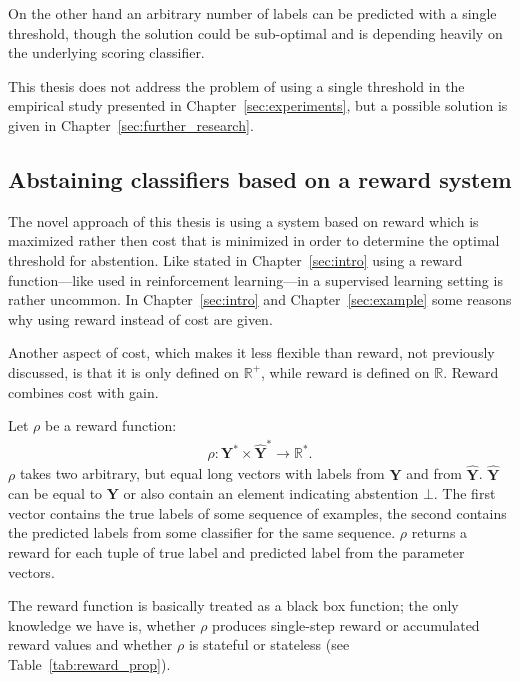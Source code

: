 \documentclass[twoside,11pt]{article}
\def\Y{\textbf{Y}}
\begin{document}
On the other hand an arbitrary number of labels can be
predicted with a single threshold, though the solution
could be sub-optimal and is depending heavily on the
underlying scoring classifier.

This thesis does not address the problem of using a single
threshold in the empirical
study presented in Chapter~\ref{sec:experiments}, but a
possible solution is given in
Chapter~\ref{sec:further_research}.

\subsection{Abstaining classifiers based on a reward
    system}
\label{subsec:reward}

The novel approach of this thesis is using a system based
on reward which is maximized rather then cost that is
minimized in order to determine the optimal threshold for
abstention.
Like stated in Chapter~\ref{sec:intro} using a reward
function---like used in reinforcement learning---in a
supervised learning setting is rather uncommon.
In Chapter~\ref{sec:intro} and Chapter~\ref{sec:example}
some reasons why using reward instead of cost are given.

Another aspect of cost, which makes it less flexible than
reward, not previously discussed, is that it is only
defined on $\mathbb{R}^+$, while reward is defined on
$\mathbb{R}$.
Reward combines cost with gain.

Let $\rho$ be a reward function:
\begin{align}
  \label{eq:rho}
  \rho: \Y^* \times \hat{\Y}^* \rightarrow \mathbb{R}^*.
\end{align}
$\rho$ takes two arbitrary, but equal long vectors with
labels from $\Y$ and from $\hat{\Y}$. $\hat{\Y}$ can be
equal to $\Y$ or also contain an element indicating
abstention $\bot$.
The first vector contains the true labels of some sequence
of examples, the second contains the predicted labels from
some classifier for the same sequence.
$\rho$ returns a reward for each tuple of true
label and predicted label from the parameter vectors.

The reward function is basically treated as a black box
function; the only knowledge we have is, whether $\rho$
produces single-step reward or accumulated reward values
and whether $\rho$ is stateful or stateless
(see Table~\ref{tab:reward_prop}).
\end{document}
